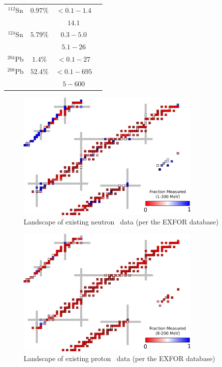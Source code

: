 \begin{table}[ht]
\begin{center}
\begin{tabular}{ c c c c }
            $^{112}$Sn & $0.97\%$ & $<0.1-1.4$ & \cite{Timokhov1989}\\
            & & $14.1$ & \cite{Dukarevich1967}\\

            $^{124}$Sn & $5.79\%$ & $0.3-5.0$ & \cite{Harper1982}\\
            & & $5.1-26$ & \cite{Rapaport1980}\\

            $^{204}$Pb & $1.4\%$ & $<0.1-27$ & \cite{Carlton2003}\\

            $^{208}$Pb & $52.4\%$ & $<0.1 - 695$ & \cite{Harvey1999}\\
            & & $5-600$ & \cite{Finlay1993}\\

            \hline
        \end{tabular}
    \end{center}
\end{table}

\begin{figure}
    \includegraphics[width=0.8\textwidth]{figures/TCSChart.png}
    \caption{Landscape of existing neutron \tot\ data (per the EXFOR database)}
    \label{TCSChart}
\end{figure}

\begin{figure}
    \includegraphics[width=0.8\textwidth]{figures/RCSChart.png}
    \caption{Landscape of existing proton \rxn\ data (per the EXFOR database)}
    \label{RCSChart}
\end{figure}

